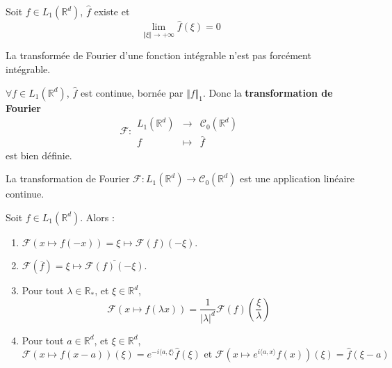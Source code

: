   \begin{lemma}
    Soit $f \in L_1(\mathbb{R}^d)$, $\widehat{f}$ existe et
    \[ \lim_{\Vert \xi \Vert \rightarrow +\infty} \widehat{f}(\xi) = 0 \]
  \end{lemma}

  \begin{remark}
    La transformée de Fourier d'une fonction intégrable n'est pas forcément intégrable.
  \end{remark}

  \begin{theorem}
    $\forall f \in L_1(\mathbb{R}^d)$, $\widehat{f}$ est continue, bornée par $\Vert f \Vert_1$. Donc la \textbf{transformation de Fourier}
    \[
    \mathcal{F} :
    \begin{array}{ccc}
      L_1(\mathbb{R}^d) &\rightarrow& \mathcal{C}_0(\mathbb{R}^d) \\
      f &\mapsto& \widehat{f}
    \end{array}
    \]
    est bien définie.
  \end{theorem}

  \begin{corollary}
    La transformation de Fourier $\mathcal{F} : L_1(\mathbb{R}^d) \rightarrow \mathcal{C}_0(\mathbb{R}^d)$ est une application linéaire continue.
  \end{corollary}

  \begin{proposition}
    Soit $f \in L_1(\mathbb{R}^d)$. Alors :
    \begin{enumerate}[label={\bfseries(\roman*)}]
      \item $\mathcal{F}(x \mapsto f(-x)) = \xi \mapsto \mathcal{F}(f)(-\xi)$.
      \item $\mathcal{F}(\overline{f}) = \xi \mapsto \overline{\mathcal{F}(f)(-\xi)}$.
      \item Pour tout $\lambda \in \mathbb{R}_*$, et $\xi \in \mathbb{R}^d$,
      \[ \mathcal{F}(x \mapsto f(\lambda x)) = \frac{1}{\vert \lambda \vert^d} \mathcal{F}(f) \left( \frac{\xi}{\lambda} \right) \]
      \item Pour tout $a \in \mathbb{R}^d$, et $\xi \in \mathbb{R}^d$,
      \[ \mathcal{F}(x \mapsto f(x-a))(\xi) = e^{-i\langle a,\xi\rangle} \widehat{f}(\xi) \text{ et } \mathcal{F}(x \mapsto e^{i\langle a,x\rangle}f(x))(\xi)=\widehat{f}(\xi-a) \]
    \end{enumerate}
  \end{proposition}

